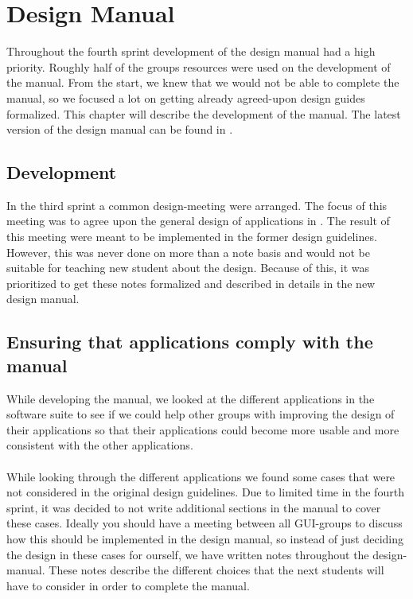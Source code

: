
\chapter{Design Manual}
\label{cha:design_manual}

Throughout the fourth sprint development of the design manual had a high priority. Roughly half of the groups resources were used on the development of the manual. From the start, we knew that we would not be able to complete the manual, so we focused a lot on getting already agreed-upon design guides formalized. This chapter will describe the development of the manual. The latest version of the design manual can be found in .

\section{Development}
\label{sec:development}
In the third sprint a common design-meeting were arranged. The focus of this meeting was to agree upon the general design of applications in \giraf. The result of this meeting were meant to be implemented in the former design guidelines. However, this was never done on more than a note basis and would not be suitable for teaching new student about the design. Because of this, it was prioritized to get these notes formalized and described in details in the new design manual. 

\section{Ensuring that applications comply with the manual}
\label{sec:ensuring_that_applications_comply_with_the_manual}
While developing the manual, we looked at the different applications in the \giraf software suite to see if we could help other groups with improving the design of their applications so that their applications could become more usable and more consistent with the other applications. 
\\\\
While looking through the different applications we found some cases that were not considered in the original design guidelines. Due to limited time in the fourth sprint, it was decided to not write additional sections in the manual to cover these cases. Ideally you should have a meeting between all GUI-groups to discuss how this should be implemented in the design manual, so instead of just deciding the design in these cases for ourself, we have written notes throughout the design-manual. These notes describe the different choices that the next students will have to consider in order to complete the manual. 